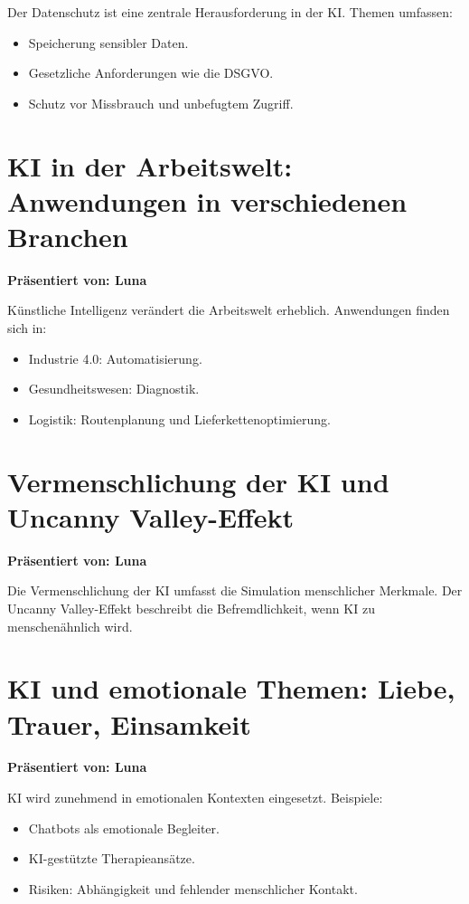 \documentclass[a4paper,12pt]{article}
\begin{document}
Der Datenschutz ist eine zentrale Herausforderung in der KI. Themen umfassen:
\begin{itemize}
    \item Speicherung sensibler Daten.
    \item Gesetzliche Anforderungen wie die DSGVO.
    \item Schutz vor Missbrauch und unbefugtem Zugriff.
\end{itemize}

\section{KI in der Arbeitswelt: Anwendungen in verschiedenen Branchen}
\textbf{Präsentiert von: Luna}

Künstliche Intelligenz verändert die Arbeitswelt erheblich. Anwendungen finden sich in:
\begin{itemize}
    \item Industrie 4.0: Automatisierung.
    \item Gesundheitswesen: Diagnostik.
    \item Logistik: Routenplanung und Lieferkettenoptimierung.
\end{itemize}

\section{Vermenschlichung der KI und Uncanny Valley-Effekt}
\textbf{Präsentiert von: Luna}

Die Vermenschlichung der KI umfasst die Simulation menschlicher Merkmale. Der Uncanny Valley-Effekt beschreibt die Befremdlichkeit, wenn KI zu menschenähnlich wird.

\section{KI und emotionale Themen: Liebe, Trauer, Einsamkeit}
\textbf{Präsentiert von: Luna}

KI wird zunehmend in emotionalen Kontexten eingesetzt. Beispiele:
\begin{itemize}
    \item Chatbots als emotionale Begleiter.
    \item KI-gestützte Therapieansätze.
    \item Risiken: Abhängigkeit und fehlender menschlicher Kontakt.
\end{itemize}
\end{document}
